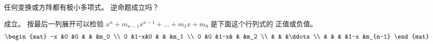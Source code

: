 \begin{exercises}
  \item
    任何变换或方阵都有极小多项式。
    逆命题成立吗？
    \begin{answer}
      成立。
      按最后一列展开可以检验
      \( x^n+m_{n-1}x^{n-1}+\dots+m_1x+m_0 \) 是下面这个行列式的
      正值或负值。
      \begin{equation*}
         \begin{mat}
            -x  &0  &0  &      &    &m_0    \\
             0  &1-x&0  &      &    &m_1    \\
             0  &0  &1-x&      &    &m_2    \\
                &   &   &\ddots             \\
                &   &   &      &1-x &m_{n-1}
         \end{mat}
      \end{equation*} 
     \end{answer}
\end{exercises}












